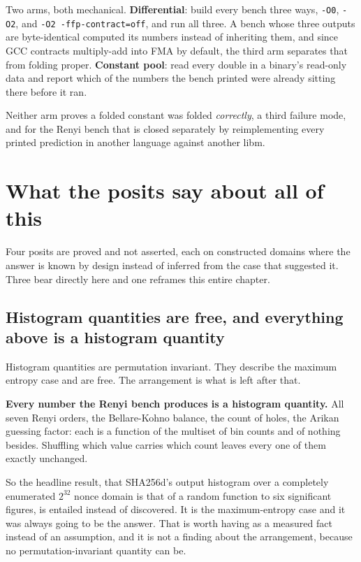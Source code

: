 Two arms, both mechanical. \textbf{Differential}: build every bench three ways, \texttt{-O0}, \texttt{-O2}, and \texttt{-O2 -ffp-contract=off}, and run all three. A bench whose three outputs are byte-identical computed its numbers instead of inheriting them, and since GCC contracts multiply-add into FMA by default, the third arm separates that from folding proper. \textbf{Constant pool}: read every double in a binary's read-only data and report which of the numbers the bench printed were already sitting there before it ran.

Neither arm proves a folded constant was folded \emph{correctly}, a third failure mode, and for the Renyi bench that is closed separately by reimplementing every printed prediction in another language against another libm.

\section{What the posits say about all of this}

Four posits are proved and not asserted, each on constructed domains where the answer is known by design instead of inferred from the case that suggested it. Three bear directly here and one reframes this entire chapter.

\subsection{Histogram quantities are free, and everything above is a histogram quantity}

Histogram quantities are permutation invariant. They describe the maximum entropy case and are free. The arrangement is what is left after that.

\textbf{Every number the Renyi bench produces is a histogram quantity.} All seven Renyi orders, the Bellare-Kohno balance, the count of holes, the Arikan guessing factor: each is a function of the multiset of bin counts and of nothing besides. Shuffling which value carries which count leaves every one of them exactly unchanged.

So the headline result, that SHA256d's output histogram over a completely enumerated \(2^{32}\) nonce domain is that of a random function to six significant figures, is entailed instead of discovered. It is the maximum-entropy case and it was always going to be the answer. That is worth having as a measured fact instead of an assumption, and it is not a finding about the arrangement, because no permutation-invariant quantity can be.

